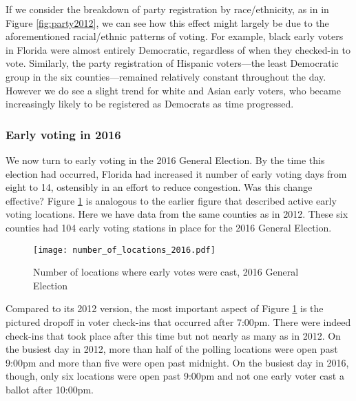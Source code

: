 \documentclass[12pt,titlepage]{article}
\begin{document}

If we consider the breakdown of party registration by race/ethnicity,
as in in Figure \ref{fig:party2012}, we can see how this effect might
largely be due to the aforementioned racial/ethnic patterns of voting.
For example, black early voters in Florida were almost entirely
Democratic, regardless of when they checked-in to vote.  Similarly,
the party registration of Hispanic voters---the least Democratic group
in the six counties---remained relatively constant throughout the day.
However we do see a slight trend for white and Asian early voters, who
became increasingly likely to be registered as Democrats as time
progressed.


\subsubsection*{Early voting in 2016}

We now turn to early voting in the 2016 General Election.  By the time
this election had occurred, Florida had increased it number of early
voting days from eight to 14, ostensibly in an effort to reduce
congestion. Was this change effective?  Figure \ref{fig:nrlocs2016} is
analogous to the earlier figure that described active early voting
locations.  Here we have data from the same counties as in 2012.
These six counties had 104 early voting stations in place for the 2016
General Election.


\begin{figure}[!ht]
  \caption{Number of locations where early votes were cast, 2016 General
    Election}
  \label{fig:nrlocs2016}
  \centering
    \centering\texttt{[image: number\_of\_locations\_2016.pdf]}
\end{figure}

Compared to its 2012 version, the most important aspect of Figure
\ref{fig:nrlocs2016} is the pictured dropoff in voter check-ins that
occurred after 7:00pm.  There were indeed check-ins that took place
after this time but not nearly as many as in 2012.  On the busiest day
in 2012, more than half of the polling locations were open past 9:00pm
and more than five were open past midnight.  On the busiest day in
2016, though, only six locations were open past 9:00pm and not one
early voter cast a ballot after 10:00pm.
\end{document}
